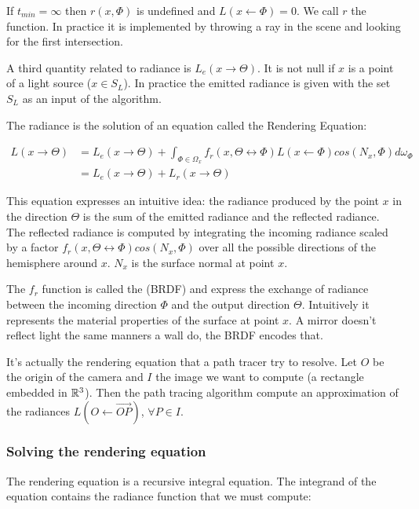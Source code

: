 If $t_{min} = \infty$ then $r(x, \Phi)$ is undefined and $L(x \leftarrow \Phi) = 0$. We call $r$ the  function. In practice it is implemented by throwing a ray in the scene and looking for the first intersection.

A third quantity related to radiance is  $L_e(x \rightarrow \Theta)$. It is not null if $x$ is a point of a light source ($x \in S_L$). In practice the emitted radiance is given with the set $S_L$ as an input of the algorithm.

The radiance is the solution of an equation called the Rendering Equation:

\begin{align*}
L(x \rightarrow \Theta) &= L_e(x \rightarrow \Theta) + \int_{\Phi \in \Omega_x} f_r(x, \Theta \leftrightarrow \Phi) L(x \leftarrow \Phi) cos(N_x, \Phi) d\omega_\Phi \\
&= L_e(x \rightarrow \Theta) + L_r(x \rightarrow \Theta)
\end{align*}

This equation expresses an intuitive idea: the radiance produced by the point $x$ in the direction $\Theta$ is the sum of the emitted radiance and the reflected radiance.  The reflected radiance is computed by integrating the incoming radiance scaled by a factor $f_r(x, \Theta \leftrightarrow \Phi) cos(N_x, \Phi)$ over all the possible directions of the hemisphere around $x$. $N_x$ is the surface normal at point $x$.

The $f_r$ function is called the  (BRDF) and express the exchange of radiance between the incoming direction $\Phi$ and the output direction $\Theta$. Intuitively it represents the material properties of the surface at point $x$. A mirror doesn't reflect light the same manners a wall do, the BRDF encodes that.

It's actually the rendering equation that a path tracer try to resolve. Let $O$ be the origin of the camera and $I$ the image we want to compute (a rectangle embedded in $\mathbb{R}^3$). Then the path tracing algorithm compute an approximation of the radiances $L(O \leftarrow \vec{OP})$, $\forall P \in I$.

\subsubsection{Solving the rendering equation}

The rendering equation is a recursive integral equation. The integrand of the equation contains the radiance function that we must compute:

